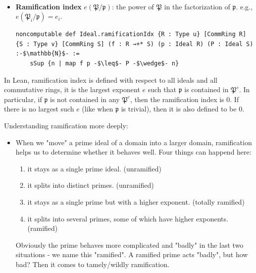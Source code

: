 \begin{defi}
    ~\begin{itemize}
        \item \textbf{Ramification index} $e(\mathfrak{P}/\mathfrak{p})$: the power of $\mathfrak{P}$ in the factorization of $\mathfrak{p}$. e.g., $e(\mathfrak{P}_i/\mathfrak{p})=e_i$.
        \begin{listing}[!htpb]
        \begin{verbatim}
noncomputable def Ideal.ramificationIdx {R : Type u} [CommRing R] {S : Type v} [CommRing S] (f : R →+* S) (p : Ideal R) (P : Ideal S) :-$\mathbb{N}$- := 
    sSup {n | map f p -$\leq$- P -$\wedge$- n}
        \end{verbatim}
        \end{listing}
    \end{itemize}
\end{defi}
\begin{rmk}
    In Lean, ramification index is defined with respect to all ideals and all commutative rings, it is the largest exponent $e$ such that $\mathfrak{p}$ is contained in $\mathfrak{P}^e$. In particular, if $\mathfrak{p}$ is not contained in any $\mathfrak{P}^e$, then the ramification index is 0. If there is no largest such $e$ (like when $\mathfrak{p}$ is trivial), then it is also defined to be 0.
\end{rmk}
\begin{rmk}
Understanding ramification more deeply:
\begin{itemize}
    \item[] When we "move" a prime ideal of a domain into a larger domain, ramification helps us to determine whether it behaves well. Four things can happend here:
    \begin{enumerate}
        \item it stays as a single prime ideal. (unramified)
        \item it splits into distinct primes. (unramified)
        \item it stays as a single prime but with a higher exponent. (totally ramified)
        \item it splits into several primes, some of which have higher exponents. (ramified)
    \end{enumerate}
    Obviously the prime behaves more complicated and "badly" in the last two situations - we name this "ramified". A ramified prime acts "badly", but how bad? Then it comes to tamely/wildly ramification.
\end{itemize}
\end{rmk}
